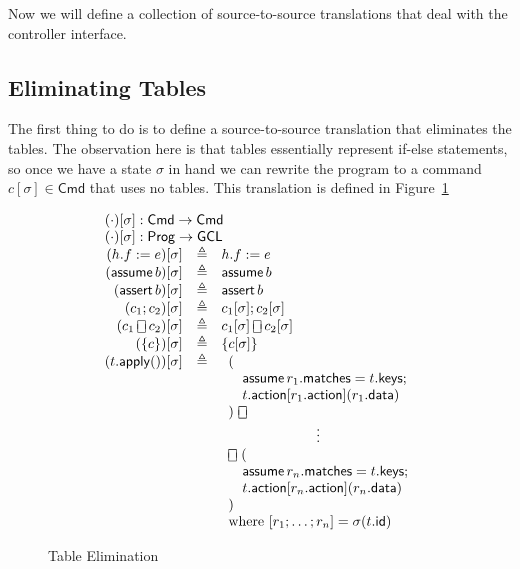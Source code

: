 \documentclass{article}
\newcommand{\Cmd}{\mathsf{Cmd}}
\newcommand{\Prog}{\mathsf{Prog}}
\newcommand{\GCL}{\mathsf{GCL}}
\newcommand{\matches}{\mathsf{matches}}
\newcommand{\action}{\mathsf{action}}
\newcommand{\keys}{\mathsf{keys}}
\newcommand{\data}{\mathsf{data}}
\newcommand{\id}{\mathsf{id}}
\newcommand{\assert}{\mathop{\mathsf{assert}}}
\newcommand{\assume}{\mathop{\mathsf{assume}}}
\newcommand{\apply}{\mathsf{apply}}
\newcommand{\choiceop}{\rotatebox[origin=c]{90}{$\sqsubset\!\!\!\sqsupset$}}
\newcommand{\choice}{\mathbin{\choiceop}}
\begin{document}
Now we will define a collection of source-to-source translations that deal with
the controller interface.

\subsection{Eliminating Tables}

The first thing to do is to define a source-to-source translation that
eliminates the tables. The observation here is that tables essentially represent
if-else statements, so once we have a state $\sigma$ in hand we can rewrite the
program to a command $c[\sigma] \in \Cmd$ that uses no tables. This translation
is defined in Figure~\ref{fig:table-elim}

\begin{figure}
  \[\begin{array}{r>{\triangleq}cl}
  \multicolumn{3}{l}{(\cdot)[\sigma] : \Cmd \to \Cmd} \\
  \multicolumn{3}{l}{(\cdot)[\sigma] : \Prog \to \GCL} \\
  (h.f := e)[\sigma] && h.f := e   \\
  (\assume b)[\sigma] && \assume b \\
  (\assert b)[\sigma] && \assert b \\
  (c_1;c_2)[\sigma] && c_1[\sigma];c_2[\sigma] \\
  (c_1 \choice c_2)[\sigma] && c_1[\sigma] \choice c_2[\sigma] \\
  (\{c\})[\sigma] && \{c[\sigma]\} \\
  (t.\apply())[\sigma] &&
  \begin{array}[t]{l}
    (\\
    \quad \assume {r_1.\matches = t.\keys};\\
    \quad t.\action[r_1.\action](r_1.\data)\\
    )~\choice\\
    \multicolumn{1}{c}{\vdots}\\
    \choice~(\\
    \quad \assume {r_n.\matches = t.\keys};\\
    \quad t.\action[r_n.\action](r_n.\data)\\
    )\\
    \textrm{where}~[r_1;\ldots;r_n] = \sigma(t.\id)
  \end{array}
  \end{array}
  \]
  \caption{Table Elimination}
  \label{fig:table-elim}
\end{figure}
\end{document}
